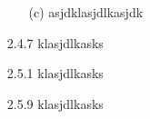 \documentclass[11pt]{article}
\begin{document}
\begin{itemize}
\begin{itemize}
            \item[(c)]
                asjdklasjdlkasjdk
        \end{itemize}

    \item[2.4.7]
        klasjdlkasks

    \item[2.5.1]
        klasjdlkasks

    \item[2.5.9]
        klasjdlkasks
\end{itemize}

\end{document}
